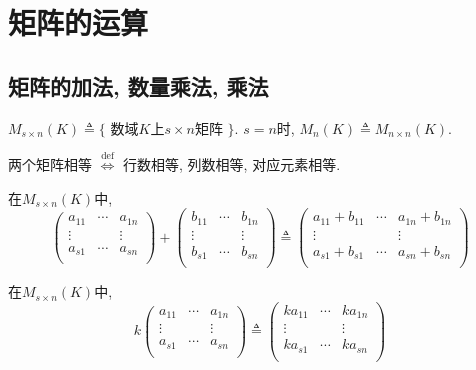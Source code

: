 \section{矩阵的运算}

\subsection{矩阵的加法, 数量乘法, 乘法}

\begin{Definition}
$M_{s \times n}(K) \triangleq \{$ 数域$K$上$s \times n$矩阵 $\}$. $s = n$时, $M_{n}(K) \triangleq M_{n \times n}(K)$.
\end{Definition}

\begin{Definition}
两个矩阵相等 $\stackrel{\text{def}}{\iff}$ 行数相等, 列数相等, 对应元素相等.
\end{Definition}

\begin{Definition} 在$M_{s \times n}(K)$中, 
\[
\begin{pmatrix}
a_{11} & \cdots & a_{1n} \\
\vdots &        & \vdots \\
a_{s1} & \cdots & a_{sn} \\
\end{pmatrix}
+
\begin{pmatrix}
b_{11} & \cdots & b_{1n} \\
\vdots &        & \vdots \\
b_{s1} & \cdots & b_{sn} \\
\end{pmatrix}
\triangleq
\begin{pmatrix}
a_{11} + b_{11} & \cdots & a_{1n} + b_{1n} \\
\vdots          &        & \vdots \\
a_{s1} + b_{s1} & \cdots & a_{sn} + b_{sn} \\
\end{pmatrix}
\]
\end{Definition}


\begin{Definition} 在$M_{s \times n}(K)$中, 
\[
k
\begin{pmatrix}
a_{11} & \cdots & a_{1n} \\
\vdots &        & \vdots \\
a_{s1} & \cdots & a_{sn} \\
\end{pmatrix}
\triangleq
\begin{pmatrix}
k a_{11} & \cdots & k a_{1n} \\
\vdots &        & \vdots \\
k a_{s1} & \cdots & k a_{sn} \\
\end{pmatrix}
\]
\end{Definition}

